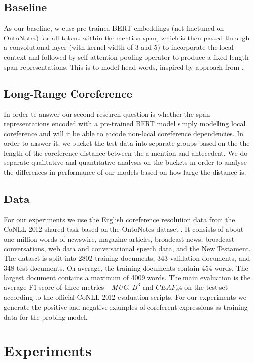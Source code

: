 \documentclass[11pt]{article}
\begin{document}
\subsection{Baseline}
As our baseline, w euse pre-trained BERT embeddings (not finetuned on OntoNotes) for all tokens within the mention span, which is then passed through a convolutional layer (with kernel width of 3 and 5) to incorporate the local context and followed by self-attention pooling operator to produce a fixed-length span representations. This is to model head words, inspired by approach from \textcite{tenney2019context}.


\subsection{Long-Range Coreference}
In order to answer our second research question is whether the span representations encoded with a pre-trained BERT model simply modelling local coreference and will it be able to encode non-local coreference dependencies. In order to answer it, we bucket the test data into separate groups based on the the length of the coreference distance between the a mention and antecedent. We do separate qualitative and quantitative analysis on the buckets in order to analyse the differences in performance of our models based on how large the distance is. 

\subsection{Data} 
For our experiments we use the English coreference resolution data
from the CoNLL-2012 shared task based on the OntoNotes dataset \parencite{conll}. It consists of about one million words of newswire, magazine articles, broadcast news, broadcast conversations, web data and conversational speech data, and the New Testament. The dataset is split into 2802 training documents, 343 validation documents, and 348 test documents. On average, the training documents contain 454 words. The largest document contains a maximum of 4009 words. The main evaluation is the average F1 score of three metrics – \textit{MUC}, $B^3$ and $CEAF_ \phi4$ on the test set according to the official CoNLL-2012 evaluation scripts. For our experiments we generate the positive and negative examples of coreferent expressions as training data for the probing model. 


\section{Experiments}
\end{document}
